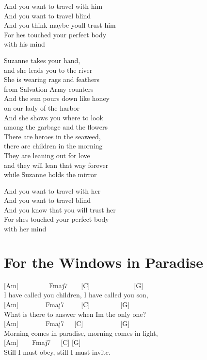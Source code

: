 \documentclass[
  letterpaper,
  twoside=false]{scrbook}
\begin{document}
And you want to travel with him\\
And you want to travel blind\\
And you think maybe you\textquotesingle ll trust him\\
For he\textquotesingle s touched your perfect body\\
with his mind

Suzanne takes your hand,\\
and she leads you to the river~~~\\
She is wearing rags and feathers\\
from Salvation Army counters\\
And the sun pours down like honey\\
on our lady of the harbor\\
And she shows you where to look\\
among the garbage and the flowers\\
There are heroes in the seaweed,\\
there are children in the morning~~~~\\
They are leaning out for love\\
and they will lean that way forever~~~\\
while Suzanne holds the mirror

And you want to travel with her\\
And you want to travel blind\\
And you know that you will trust her\\
For she\textquotesingle s touched your perfect body\\
with her mind

\hypertarget{for-the-windows-in-paradise}{%
\chapter{For the Windows in
Paradise}\label{for-the-windows-in-paradise}}

{[}Am{]}~~~~~~~~~Fmaj7~~~~{[}C{]}~~~~~~~~~~~~~{[}G{]}\\
I have called you children, I have called you son,\\
{[}Am{]}~~~~~~~~Fmaj7~~~~~{[}C{]}~~~~~~~~~{[}G{]}\\
What is there to answer when I\textquotesingle m the only one?\\
{[}Am{]}~~~~~~~~Fmaj7~~~{[}C{]}~~~~~~~~~~~{[}G{]}\\
Morning comes in paradise, morning comes in light,\\
{[}Am{]}~~~~Fmaj7~~~{[}C{]} {[}G{]}\\
Still I must obey, still I must invite.
\end{document}
